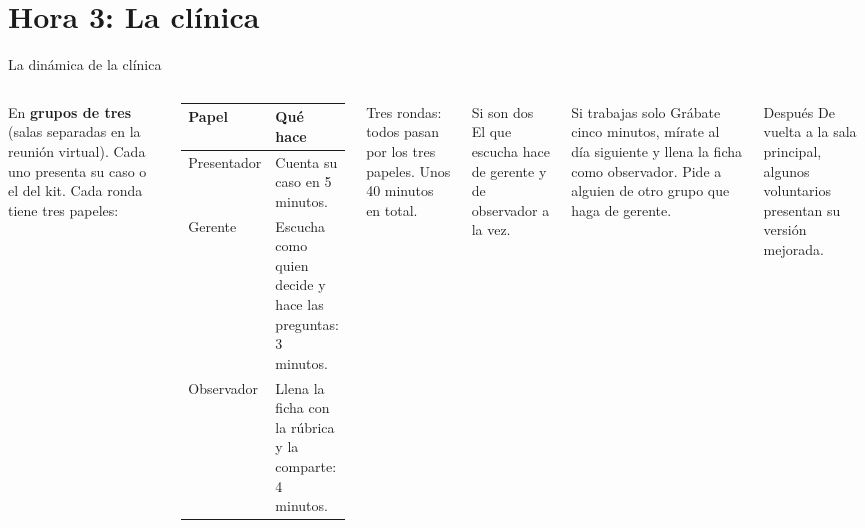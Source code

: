 \documentclass[aspectratio=169,11pt]{beamer}
\begin{document}
\section{Hora 3: La clínica}
\begin{frame}[t]{La dinámica de la clínica}
  \begin{columns}[T,onlytextwidth]
    \small En \textbf{grupos de tres} (salas separadas en la reunión
    virtual). Cada uno presenta su caso o el del kit. Cada ronda tiene tres
    papeles:
    \vspace{0.05cm}

    \footnotesize
    \renewcommand{\arraystretch}{1.25}
    \begin{tabular}{@{}L{1.9cm}L{5.3cm}@{}}
      \toprule
      \textbf{Papel} & \textbf{Qué hace} \\
      \midrule
      Presentador & Cuenta su caso en 5 minutos. \\
      Gerente & Escucha como quien decide y hace las preguntas: 3 minutos. \\
      Observador & Llena la ficha con la rúbrica y la comparte: 4 minutos. \\
      \bottomrule
    \end{tabular}
    \vspace{0.1cm}

    \small Tres rondas: todos pasan por los tres papeles. Unos 40 minutos
    en total.
    \begin{block}{Si son dos}
      \footnotesize El que escucha hace de gerente y de observador a la
      vez.
    \end{block}
    \begin{block}{Si trabajas solo}
      \footnotesize Grábate cinco minutos, mírate al día siguiente y llena
      la ficha como observador. Pide a alguien de otro grupo que haga de
      gerente.
    \end{block}
    \begin{exampleblock}{Después}
      \footnotesize De vuelta a la sala principal, algunos voluntarios
      presentan su versión mejorada.
    \end{exampleblock}
  \end{columns}
\end{frame}
\end{document}
